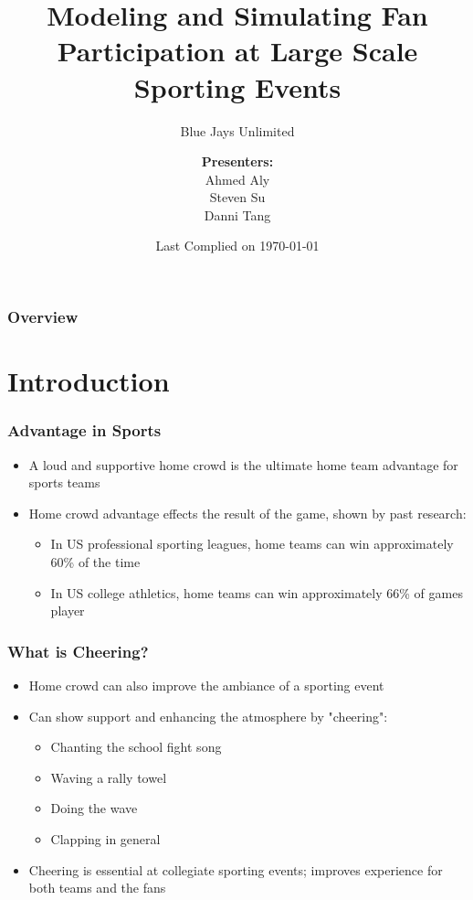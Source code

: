 \documentclass[compress,handout,10pt]{beamer}
\title{{\LARGE Modeling and Simulating Fan Participation at Large Scale Sporting Events\newline} }
\subtitle{{\large Blue Jays Unlimited} }
\author{ 
    {\bf{Presenters:}}\\ 
Ahmed Aly\\
Steven Su \\
Danni Tang\\ 
    \vspace{5pt}
}
\institute{JHU AMS 550.400 Fall 2012}
\date{Last Complied on \today}
\let\olditem\item
\renewcommand{\item}{\setlength{\itemsep}{0.5\baselineskip}\olditem}
\begin{document}
\begin{frame}[plain]
	\titlepage
\end{frame}

\begin{frame} [allowframebreaks]
	\frametitle{Overview}
{\small \tableofcontents}
\end{frame}


\section{Introduction}

\begin{frame}
	\frametitle{Advantage in Sports}
		\begin {itemize}
			\item A loud and supportive home crowd is the ultimate home team advantage for sports teams
			\item Home crowd advantage effects the result of the game, shown by past research:
			\begin{itemize}
				\item In US professional sporting leagues, home teams can win approximately 60\% of the time \cite{Jamieson_2010}
				\item In US college athletics, home teams can win approximately 66\% of games player \cite{Snyder_1985}
			\end{itemize}
		\end {itemize}
\end{frame}

\begin{frame}
	\frametitle{What is Cheering?}
		\begin{itemize}
		\item Home crowd can also improve the ambiance of a sporting event
		\item Can show support and enhancing the atmosphere by "cheering":
		\begin{itemize}
			\item Chanting the school fight song
			\item Waving a rally towel
			\item Doing the wave
			\item Clapping in general
		\end{itemize}
	\item Cheering is essential at collegiate sporting events; improves experience for both teams and the fans
	\end{itemize}
\end{frame}
\end{document}
